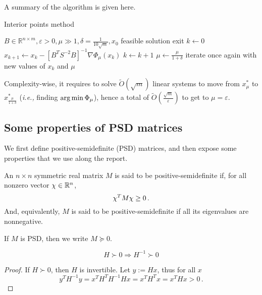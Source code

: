 A summary of the algorithm is given here.
\begin{algorithm}[H]
    \caption{Interior points method}
    \label{alg:ipm}
    \begin{algorithmic}[1]
        \Require $B \in \mathbb R^{n\times m}, \varepsilon > 0, \mu \gg 1,  \delta = \frac{1}{10\sqrt{m}}, x_0$ feasible solution
        \If {$\mu = \varepsilon$}
            \State exit
        \EndIf
        \State $k \leftarrow 0$
         
            \State $x_{k+1} \leftarrow x_k - \left[B^TS^{-2}B\right]^{-1}\nabla \Phi_\mu(x_k)$
            \State $k \leftarrow k+1$
        \EndWhile {}
        \State $\mu \leftarrow \frac{\mu}{1 + \delta}$  
        \State iterate once again with new values of $x_k$ and $\mu$
    \end{algorithmic}
\end{algorithm}


Complexity-wise, it requires to solve $\tilde O(\sqrt{m})$ linear systems to
move from $x_\mu^*$ to $x_\frac{\mu}{1 + \delta}^*$ (\emph{i.e.,} finding
$\operatorname*{arg\,min} \Phi_\mu$), hence a total of $\tilde O(\frac{\sqrt m}{\varepsilon})$ to
get to $\mu = \varepsilon$.

\subsection{Some properties of PSD matrices}\label{sec:psd-prop}
We first define positive-semidefinite (PSD) matrices, and then expose some
properties that we use along the report.
\begin{definition}
An $n \times n$ symmetric real matrix $M$ is said to be positive-semidefinite if,
for all nonzero vector $\chi \in \mathbb R^n$,
\begin{equation*}
    \chi^T M \chi \geq 0 \, .
\end{equation*}
And, equivalently, $M$ is said to be positive-semidefinite if all its
eigenvalues are nonnegative.
\end{definition}
If $M$ is PSD, then we write $M \succcurlyeq 0$.
\begin{proposition}\label{prop:psd-inverse}
    $$H  \succ 0 \Rightarrow H^{-1} \succ 0$$
\end{proposition}
\begin{proof}
    If $H \succ 0$, then $H$ is invertible. Let $y := Hx $, thus for all $x$
    \begin{equation*}
    y^T H^{-1}y = x^T H^TH^{-1}Hx = x^T H^T x = x^THx > 0 \, .
    \end{equation*}
\end{proof}


